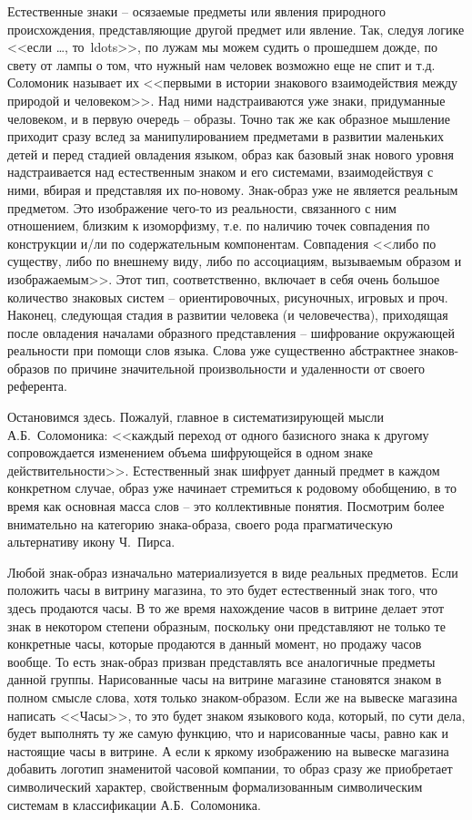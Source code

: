 Естественные знаки -- осязаемые предметы или явления природного происхождения,
представляющие другой предмет или явление. Так, следуя логике <<если \ldots, то\ ldots>>,
по лужам мы можем судить о прошедшем дожде, по свету от лампы о том,
что нужный нам человек возможно еще не спит и т.д. Соломоник называет их
<<первыми в истории знакового взаимодействия между природой и человеком>>\autocite[][78]{solomonik2009}.
Над ними надстраиваются уже знаки, придуманные человеком, и в первую очередь --
образы. Точно так же как образное мышление приходит сразу вслед за
манипулированием предметами в развитии маленьких детей и перед стадией
овладения языком, образ как базовый знак нового уровня надстраивается над
естественным знаком и его системами, взаимодействуя с ними, вбирая и представляя
их по-новому. Знак-образ уже не является реальным предметом. Это изображение
чего-то из реальности, связанного с ним отношением, близким к изоморфизму,
т.е. по наличию точек совпадения по конструкции и/ли по содержательным
компонентам. Совпадения <<либо по существу, либо по внешнему виду, либо по
ассоциациям, вызываемым образом и изображаемым>>\autocite[][52]{solomonik1995}.
Этот тип, соответственно, включает в себя очень большое количество
знаковых систем -- ориентировочных, рисуночных, игровых и проч.
Наконец, следующая стадия в развитии человека (и человечества),
приходящая после овладения началами образного представления -- шифрование
окружающей реальности при помощи слов языка. Слова уже существенно абстрактнее
знаков-образов по причине значительной произвольности и удаленности от
своего референта.

Остановимся здесь. Пожалуй, главное в систематизирующей мысли А.Б.~Соломоника:
<<каждый переход от одного базисного знака к другому сопровождается изменением
объема шифрующейся в одном знаке действительности>>\autocite[][79]{solomonik2009}.
Естественный знак шифрует данный предмет в каждом конкретном случае, образ
уже начинает стремиться к родовому обобщению, в то время как основная
масса слов -- это коллективные понятия. Посмотрим более внимательно на категорию
знака-образа, своего рода прагматическую альтернативу икону Ч.~Пирса.

Любой знак-образ изначально материализуется в виде реальных предметов.
Если положить часы в витрину магазина, то это будет естественный знак того,
что здесь продаются часы. В то же время нахождение часов в витрине делает
этот знак в некотором степени образным, поскольку они представляют не только
те конкретные часы, которые продаются в данный момент, но продажу часов вообще.
То есть знак-образ призван представлять все аналогичные предметы данной группы.
Нарисованные часы на витрине магазине становятся знаком в полном смысле слова,
хотя только знаком-образом. Если же на вывеске магазина написать <<Часы>>,
то это будет знаком языкового кода, который, по сути дела, будет выполнять
ту же самую функцию, что и нарисованные часы, равно как и настоящие часы в
витрине. А если к яркому изображению на вывеске магазина добавить логотип
знаменитой часовой компании, то образ сразу же приобретает символический
характер, свойственным формализованным символическим системам в классификации
А.Б.~Соломоника.

